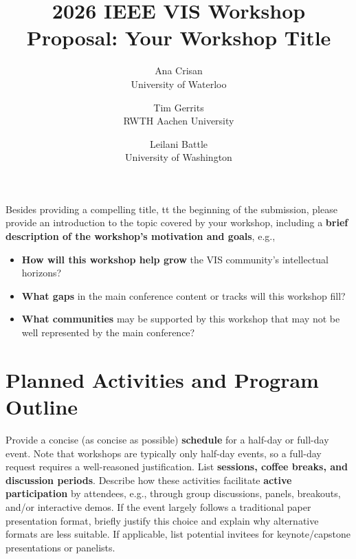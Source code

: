 \documentclass{vgtc}                          %
\title{2026 IEEE VIS Workshop Proposal: Your Workshop Title}
\author{Ana Crisan\\ %
        \scriptsize University of Waterloo %
\and Tim Gerrits\\ %
     \scriptsize RWTH Aachen University %
\and Leilani Battle\\ %
    University of Washington
}
\begin{document}


\maketitle


Besides providing a compelling title, tt the beginning of the submission, please provide an introduction to the topic covered by your workshop, including a \textbf{brief description of the workshop's motivation and goals}, e.g.,
\begin{itemize}
    \item \textbf{How will this workshop help grow} the VIS community’s intellectual horizons?
    \item \textbf{What gaps} in the main conference content or tracks will this workshop fill?
    \item \textbf{What communities} may be supported by this workshop that may not be well represented by the main conference?
\end{itemize}


\section{Planned Activities and Program Outline}

Provide a concise (as concise as possible) \textbf{schedule} for a half-day or full-day event.
Note that workshops are typically only half-day events, so a full-day request requires a well-reasoned justification.
List \textbf{sessions, coffee breaks, and discussion periods}.
Describe how these activities facilitate \textbf{active participation} by attendees, e.g., through group discussions, panels, breakouts, and/or interactive demos.
If the event largely follows a traditional paper presentation format, briefly justify this choice and explain why alternative formats are less suitable.
If applicable, list potential invitees for keynote/capstone presentations or panelists.
\end{document}
